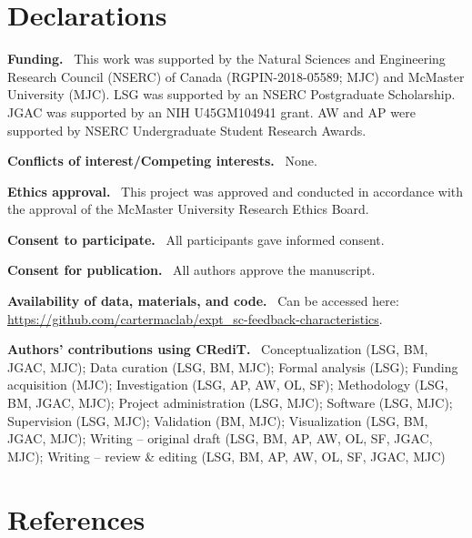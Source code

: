 \documentclass[
  man, donotrepeattitle,floatsintext]{apa7}
\begin{document}
\hypertarget{declarations}{%
\section{Declarations}\label{declarations}}

\noindent
\textbf{Funding.} ~This work was supported by the Natural Sciences and Engineering Research Council (NSERC) of Canada (RGPIN-2018-05589; MJC) and McMaster University (MJC). LSG was supported by an NSERC Postgraduate Scholarship. JGAC was supported by an NIH U45GM104941 grant. AW and AP were supported by NSERC Undergraduate Student Research Awards.

\noindent
\textbf{Conflicts of interest/Competing interests.} ~None.

\noindent
\textbf{Ethics approval.} ~This project was approved and conducted in accordance with the approval of the McMaster University Research Ethics Board.

\noindent
\textbf{Consent to participate.} ~All participants gave informed consent.

\noindent
\textbf{Consent for publication.} ~All authors approve the manuscript.

\noindent
\textbf{Availability of data, materials, and code.} ~Can be accessed here: \url{https://github.com/cartermaclab/expt_sc-feedback-characteristics}.

\noindent
\textbf{Authors' contributions using CRediT.} ~Conceptualization (LSG, BM, JGAC, MJC); Data curation (LSG, BM, MJC); Formal analysis (LSG); Funding acquisition (MJC); Investigation (LSG, AP, AW, OL, SF); Methodology (LSG, BM, JGAC, MJC); Project administration (LSG, MJC); Software (LSG, MJC); Supervision (LSG, MJC); Validation (BM, MJC); Visualization (LSG, BM, JGAC, MJC); Writing -- original draft (LSG, BM, AP, AW, OL, SF, JGAC, MJC); Writing -- review \& editing (LSG, BM, AP, AW, OL, SF, JGAC, MJC)

\hypertarget{references}{%
\section{References}\label{references}}

\vspace{2ex}
\end{document}
